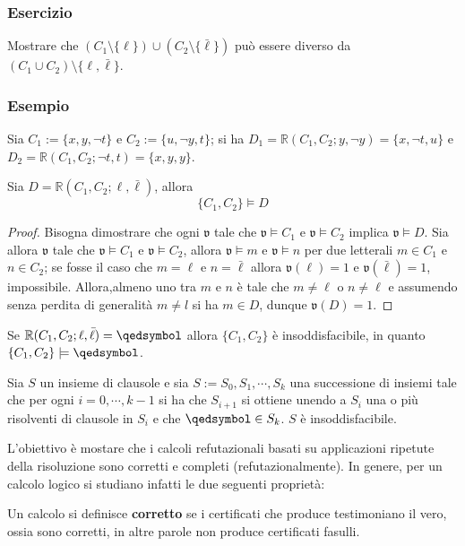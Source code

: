 \subsubsection{Esercizio}
Mostrare che $(C_1 \setminus \{\ell\}) \cup (C_2 \setminus \{\bar{\ell}\})$ può essere 
diverso da $(C_1 \cup C_2) \setminus \{\ell, \bar{\ell}\}$. 

\subsubsection{Esempio}
Sia $C_1 := \{x, y, \neg t\}$ e $C_2 := \{u, \neg y, t\}$; 
si ha $D_1 = \mathbb{R}(C_1, C_2; y, \neg y) = \{x, \neg t, u\}$ e 
$D_2 = \mathbb{R}(C_1, C_2; \neg t, t) = \{x, y, y\}$. 

\begin{lem}
        Sia $D = \mathbb{R}(C_1, C_2; \ell, \bar{\ell})$, allora 
        $$
        \{C_1, C_2\} \models D
        $$
\end{lem}

\begin{proof}
        Bisogna dimostrare che ogni $\mathfrak{v}$ tale che $\mathfrak{v} \models C_1$ 
        e $\mathfrak{v} \models C_2$ implica $\mathfrak{v} \models D$. Sia allora 
        $\mathfrak{v}$ tale che $\mathfrak{v} \models C_1$ 
        e $\mathfrak{v} \models C_2$, allora $\mathfrak{v} \models m$ e 
        $\mathfrak{v} \models n$ per due letterali $m \in C_1$ e $n \in C_2$; 
        se fosse il caso che $m = \ell$ e  $n = \bar{\ell}$ allora 
        $\mathfrak{v}(\ell) = 1$ e $\mathfrak{v}(\bar\ell) = 1$, impossibile. 
        Allora,almeno uno tra $m$ e $n$ è tale che $m \neq \ell$ o $n \neq \ell$ 
        e assumendo senza perdita di generalità $m \neq l$ si ha 
        $m \in D$, dunque $\mathfrak{v}(D) = 1$. 
\end{proof}

\begin{cor}
        Se $\mathbb{R}(C_1, C_2; \ell, \bar{\ell}) = \qedsymbol$ allora 
        $\{C_1, C_2\}$ è insoddisfacibile, in quanto $\{C_1, C_2\} \models \qedsymbol$.
\end{cor}
\begin{cor}
        Sia $S$ un insieme di clausole e sia $S := S_0, S_1, \cdots, S_k$ una 
        successione di insiemi tale che per ogni $i = 0, \cdots, k-1$ 
        si ha che $S_{i+1}$ si ottiene unendo a $S_i$ una o più risolventi 
        di clausole in $S_i$ e che $\qedsymbol \in S_k$. $S$ è 
        insoddisfacibile.
\end{cor}
L'obiettivo è mostare che i calcoli refutazionali basati su applicazioni 
ripetute della risoluzione sono corretti e completi (refutazionalmente).
In genere, per un calcolo logico si studiano infatti le due
seguenti proprietà:
\begin{defi}[Correttezza]
        Un calcolo si definisce \textbf{corretto} se i certificati che produce 
        testimoniano il vero, ossia sono corretti, in altre parole 
        non produce certificati fasulli. 
\end{defi}

